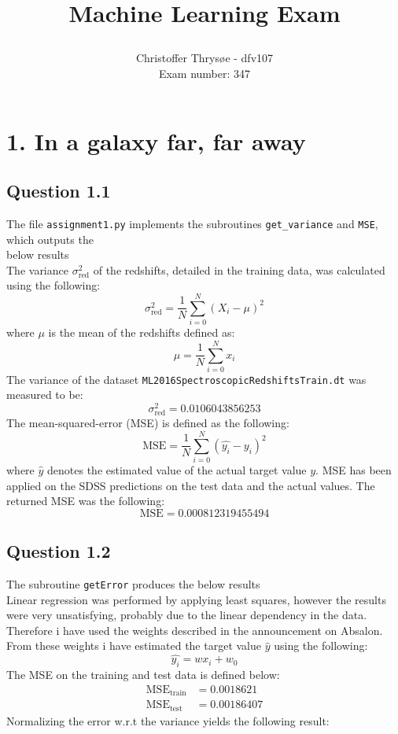 \documentclass{article}
\title{
\vspace{1in}
\textmd{\textbf{Machine Learning Exam}} \\
\author{Christoffer Thrysøe - dfv107 \\ Exam number: 347}
}
\begin{document}
\maketitle
{}
\section{1. In a galaxy far, far away}
\subsection{Question 1.1}
The file \texttt{assignment1.py} implements the subroutines \texttt{get\_variance} and \texttt{MSE}, which outputs the\\below results \\
The variance $\sigma^ 2_{\text{red}}$ of the redshifts, detailed in the training data, was calculated using the following:
\begin{equation}
\sigma^2_{\text{red}} = \dfrac{1}{N} \sum\limits_{i=0}^N(X_i-\mu)^2
\end{equation}
where $\mu$ is the mean of the redshifts defined as:
\begin{equation}
\mu = \dfrac{1}{N} \sum\limits_{i=0}^N x_i
\end{equation}
The variance of the dataset \texttt{ML2016SpectroscopicRedshiftsTrain.dt} was measured to be:
$$
\sigma^ 2_{\text{red}} = 0.0106043856253
$$
The mean-squared-error (MSE) is defined as the following:
\begin{equation}
\text{MSE} = \dfrac{1}{N} \sum\limits_{i=0}^N (\hat{y_i} - y_i)^2 
\end{equation}
where $\hat{y}$ denotes the estimated value of the actual target value $y$. 
MSE has been applied on the SDSS predictions on the test data and the actual values. The returned MSE was the following:
$$
\text{MSE} = 0.000812319455494
$$
\subsection{Question 1.2}
The subroutine \texttt{getError} produces the below results
\\
Linear regression was performed by applying least squares, however the results were very unsatisfying, probably due to the linear dependency in the data. Therefore i have used the weights described in the announcement on Absalon. From these weights i have estimated the target value $\hat{y}$ using the following:
\begin{equation}
\hat{y_i} = wx_i+w_0
\end{equation}
The MSE on the training and test data is defined below:
\begin{align*}
\text{MSE}_{\text{train}} &=  0.0018621 \\
\text{MSE}_{\text{test}} &= 0.00186407
\end{align*}
Normalizing the error w.r.t the variance yields the following result:
\end{document}
